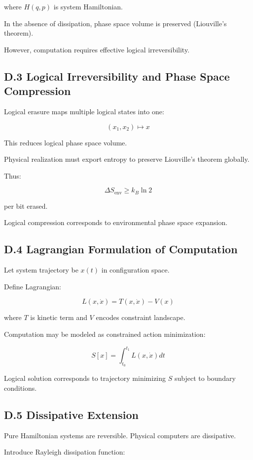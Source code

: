 \documentclass[11pt,openany]{book}
\begin{document}
where $H(q,p)$ is system Hamiltonian.

In the absence of dissipation, phase space volume is preserved 
(Liouville's theorem).

However, computation requires effective logical irreversibility.

\subsection{D.3 Logical Irreversibility and Phase Space Compression}

Logical erasure maps multiple logical states into one:

\[
(x_1, x_2) \mapsto x
\]

This reduces logical phase space volume.

Physical realization must export entropy to preserve 
Liouville's theorem globally.

Thus:

\[
\Delta S_{\text{env}} \ge k_B \ln 2
\]

per bit erased.

Logical compression corresponds to environmental phase space expansion.

\subsection{D.4 Lagrangian Formulation of Computation}

Let system trajectory be $x(t)$ in configuration space.

Define Lagrangian:

\[
L(x,\dot{x}) = T(x,\dot{x}) - V(x)
\]

where $T$ is kinetic term and $V$ encodes constraint landscape.

Computation may be modeled as constrained action minimization:

\[
S[x] = \int_{t_0}^{t_1} L(x,\dot{x}) dt
\]

Logical solution corresponds to trajectory minimizing $S$ 
subject to boundary conditions.

\subsection{D.5 Dissipative Extension}

Pure Hamiltonian systems are reversible.
Physical computers are dissipative.

Introduce Rayleigh dissipation function:
\end{document}
